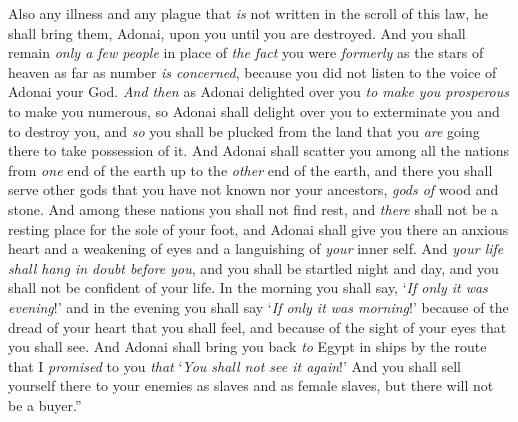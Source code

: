 \begin{biblechapter}
\verse Also any illness and any plague that \textit{is} not written in the scroll of this law, he shall bring them, Adonai, upon you until you are destroyed.
\verse And you shall remain \textit{only a few people} in place of \textit{the fact} you were \textit{formerly} as the stars of heaven as far as number \textit{is concerned}, because you did not listen to the voice of Adonai your God.
\verse \textit{And then} as Adonai delighted over you \textit{to make you prosperous} to make you numerous, so Adonai shall delight over you to exterminate you and to destroy you, and \textit{so} you shall be plucked from the land that you \textit{are} going there to take possession of it.
\verse And Adonai shall scatter you among all the nations from \textit{one} end of the earth up to the \textit{other} end of the earth, and there you shall serve other gods that you have not known nor your ancestors, \textit{gods of} wood and stone.
\verse And among these nations you shall not find rest, and \textit{there} shall not be a resting place for the sole of your foot, and Adonai shall give you there an anxious heart and a weakening of eyes and a languishing of \textit{your} inner self.
\verse And \textit{your life shall hang in doubt before you}, and you shall be startled night and day, and you shall not be confident of your life.
\verse In the morning you shall say, ‘\textit{If only it was evening}!’ and in the evening you shall say ‘\textit{If only it was morning}!’ because of the dread of your heart that you shall feel, and because of the sight of your eyes that you shall see.
\verse And Adonai shall bring you back \textit{to} Egypt in ships by the route that I \textit{promised} to you \textit{that} ‘\textit{You shall not see it again}!’ And you shall sell yourself there to your enemies as slaves and as female slaves, but there will not be a buyer.”
\end{biblechapter}

